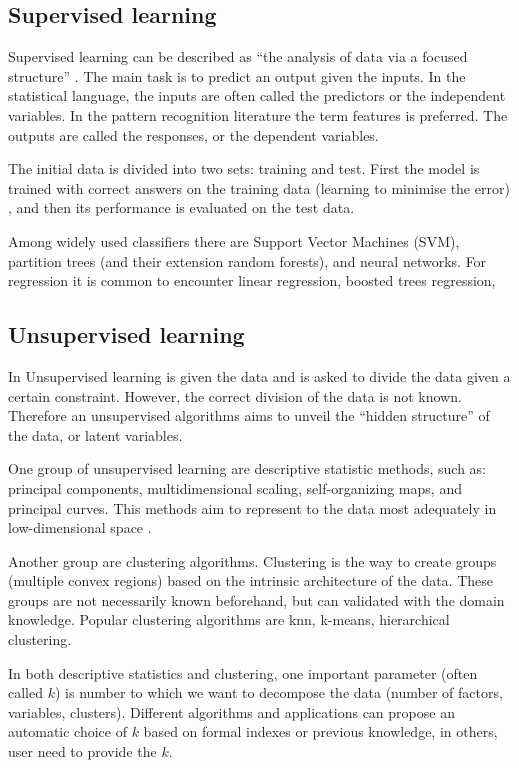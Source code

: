 \documentclass[12pt,]{book}
\theoremstyle{definition}
\theoremstyle{definition}
\theoremstyle{definition}
\theoremstyle{remark}
\begin{document}
\hypertarget{supervised-learning}{%
\subsection{Supervised learning}\label{supervised-learning}}

Supervised learning can be described as ``the analysis of data via a
focused structure'' \citep{Piegorsch}. The main task is to predict an
output given the inputs. In the statistical language, the inputs are
often called the predictors or the independent variables. In the pattern
recognition literature the term features is preferred. The outputs are
called the responses, or the dependent variables. \citep{Hastie2009}

The initial data is divided into two sets: training and test. First the
model is trained with correct answers on the training data (learning to
minimise the error) , and then its performance is evaluated on the test
data.

Among widely used classifiers there are Support Vector Machines (SVM),
partition trees (and their extension random forests), and neural
networks. For regression it is common to encounter linear regression,
boosted trees regression,

\hypertarget{unsup}{%
\subsection{Unsupervised learning}\label{unsup}}

In Unsupervised learning is given the data and is asked to divide the
data given a certain constraint. However, the correct division of the
data is not known. Therefore an unsupervised algorithms aims to unveil
the ``hidden structure'' of the data, or latent variables.

One group of unsupervised learning are descriptive statistic methods,
such as: principal components, multidimensional scaling, self-organizing
maps, and principal curves. This methods aim to represent to the data
most adequately in low-dimensional space \citep{Hastie2009}.

Another group are clustering algorithms. Clustering is the way to create
groups (multiple convex regions) based on the intrinsic architecture of
the data. These groups are not necessarily known beforehand, but can
validated with the domain knowledge. Popular clustering algorithms are
knn, k-means, hierarchical clustering.

In both descriptive statistics and clustering, one important parameter
(often called \(k\)) is number to which we want to decompose the data
(number of factors, variables, clusters). Different algorithms and
applications can propose an automatic choice of \(k\) based on formal
indexes or previous knowledge, in others, user need to provide the
\(k\).
\end{document}
